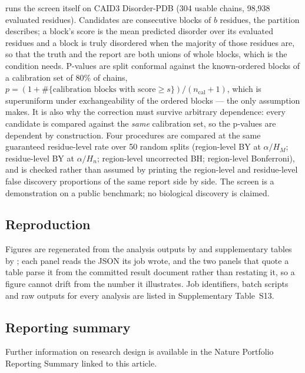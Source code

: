  runs the screen itself on CAID3 Disorder-PDB (304
usable chains, 98{,}938 evaluated residues). Candidates are consecutive blocks
of $b$ residues, the partition  describes; a block's score is
the mean predicted disorder over its evaluated residues and a block is truly
disordered when the majority of those residues are, so that the truth and the
report are both unions of whole blocks, which is the condition 
needs. P-values are split conformal against the known-ordered blocks of a
calibration set of 80\% of chains,
$p = (1 + \#\{\text{calibration blocks with score} \ge s\})/(n_{\text{cal}}+1)$,
which is superuniform under exchangeability of the ordered blocks --- the only
assumption  makes. It is also why the
correction must survive arbitrary dependence: every candidate is compared against
the \emph{same} calibration set, so the p-values are dependent by construction.
Four procedures are compared at the same guaranteed residue-level rate over 50
random splits (region-level BY at $\alpha/H_M$; residue-level BY at
$\alpha/H_n$; region-level uncorrected BH; region-level Bonferroni), and
 is checked rather than assumed by printing the region-level and
residue-level false discovery proportions of the same report side by side. The
screen is a demonstration on a public benchmark; no biological discovery is
claimed.

\subsection*{Reproduction}

Figures are regenerated from the analysis outputs by 
and supplementary tables by ; each panel reads
the JSON its job wrote, and the two panels that quote a table parse it from the
committed result document rather than restating it, so a figure cannot drift from
the number it illustrates. Job identifiers, batch scripts and raw outputs for
every analysis are listed in Supplementary Table~S13.

\subsection*{Reporting summary}

Further information on research design is available in the Nature Portfolio
Reporting Summary linked to this article.
